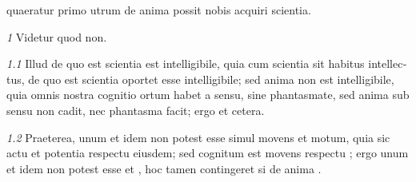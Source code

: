 \documentclass[a4paper, 12pt]{book}
\newcommand{\metatext}[1]{<#1>}
\newcommand{\no}[1]{\emph{#1}\quad}
\begin{document}
\begin{latin}
\beginnumbering

\pstart[\subsection*{\metatext{De scientia}}]
%
%
quaeratur
primo utrum de anima possit nobis acquiri scientia.
\pend

\medbreak

\pstart[\medbreak{}]
%
\no{1}
Videtur quod non.
\pend

\pstart
{}%
\no{1.1}
Illud de quo est scientia est intelligibile, quia cum scientia sit habitus
intellectus, de quo est scientia oportet esse intelligibile; sed anima non est
intelligibile, quia omnis nostra cognitio ortum habet a sensu,  sine phantasmate, sed anima sub sensu non cadit, nec
phantasma facit; ergo et cetera.
\pend

\pstart
{}%
\no{1.2}
Praeterea, unum et idem non potest esse simul movens et motum,
quia sic  actu et potentia respectu
eiusdem; sed cognitum est movens respectu ; ergo unum et idem non
potest esse  et
, hoc tamen
contingeret si de anima .
\pend

\endnumbering
\end{latin}
\end{document}
